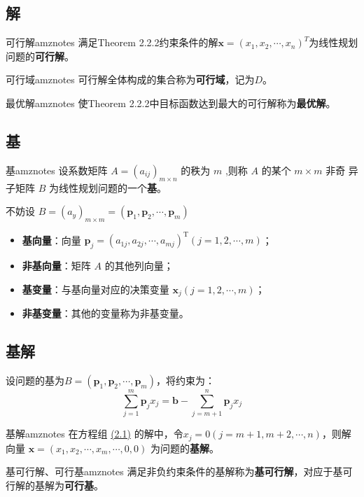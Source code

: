     \subsection{解}
    \begin{dfnbox}{可行解}{amznotes}
        满足Theorem 2.2.2约束条件的解$\mathbf{x}=(x_1,x_2,\cdots,x_n)^T$为线性规划问题的\textbf{可行解}。
    \end{dfnbox}
    \begin{dfnbox}{可行域}{amznotes}
        可行解全体构成的集合称为\textbf{可行域}，记为$D$。
    \end{dfnbox}
    \begin{dfnbox}{最优解}{amznotes}
        使Theorem 2.2.2中目标函数达到最大的可行解称为\textbf{最优解}。
    \end{dfnbox}

    \subsection{基}
    \begin{dfnbox}{基}{amznotes}
        设系数矩阵 $A = {\left( {a}_{ij}\right) }_{m \times  n}$ 的秩为 $m$ ,则称 $A$ 的某个 $m \times  m$ 非奇
    异子矩阵 $B$ 为线性规划问题的一个\textbf{基}。
    \end{dfnbox}
    不妨设 $B = {\left( {a}_{y}\right) }_{m \times  m} = \left( {\mathbf{p}}_{1},{\mathbf{p}}_{2},\cdots ,{\mathbf{p}}_{m}\right)$
    \begin{itemize}
    \item \textbf{基向量}：向量 ${\mathbf{p}}_{j} = {\left( {a}_{1j},{a}_{2j},\cdots ,{a}_{mj}\right) }^{\mathrm{T}}\left( {j = 1,2,\cdots ,m}\right)$；
    \item \textbf{非基向量}：矩阵 $A$ 的其他列向量；
    \item \textbf{基变量}：与基向量对应的决策变量 ${\mathbf{x}}_{j}\left( j = 1,2,\cdots ,m \right)$；
    \item \textbf{非基变量}：其他的变量称为非基变量。
    \end{itemize}
    
    \subsection{基解}
    设问题的基为$B = \left( {\mathbf{p}}_{1},{\mathbf{p}}_{2},\cdots ,{\mathbf{p}}_{m}\right)$，将约束为：
    \begin{equation}
        \label{eq:2.1}
        \sum_{j=1}^{m} \mathbf{p}_{j}x_{j}=\mathbf{b} - \sum_{j=m+1}^{n} \mathbf{p}_{j}x_{j}
    \end{equation}
    \begin{dfnbox}{基解}{amznotes}
        在方程组 \hyperref[eq:2.1]{(2.1)} 的解中，令$x_j=0(j= m+1, m+2, \cdots , n)$，则解向量 
        \(\mathbf{x} = (x_{1}, x_{2}, \cdots, x_{m}, \cdots, 0, 0)\) 为问题的\textbf{基解}。
    \end{dfnbox}
    \begin{dfnbox}{基可行解、可行基}{amznotes}
        满足非负约束条件的基解称为\textbf{基可行解}，对应于基可行解的基解为\textbf{可行基}。
    \end{dfnbox}

